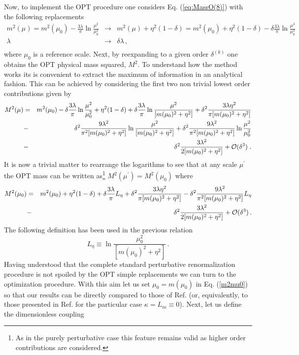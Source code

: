 \documentclass[a4paper,11pt]{article}
\def\nn{\nonumber}
\def\be{\begin{equation}}
\def\ee{\end{equation}}
\def\bea{\begin{eqnarray}}
\def\eea{\end{eqnarray}}
\def\lm{L_m}
\def\leta{L_\eta}
\begin{document}
Now, to implement the OPT procedure one considers Eq. (\ref {eq:MassO(8)}) with the following  replacements \cite{opt_phi4}
\bea\label{eq:OPT}
m^2(\mu)= m^2(\mu_0) -   \frac{3\lambda}{\pi}\ln{\frac{\mu^2}{\mu_0^2}} &\longrightarrow& m^2(\mu) + \eta^2(1-\delta) = m^2(\mu_0) + \eta^2(1-\delta)- \delta  \frac{3\lambda}{\pi}\ln{\frac{\mu^2}{\mu_0^2}} \nn \\ \nn
\lambda &\longrightarrow& \delta\lambda \,,\\
\label{replaceOPT}
\eea
where $\mu_0$ is a reference scale. Next,  by reexpanding to a given order $\delta^{(k)}$ one obtains the OPT physical mass squared, $M^2$. To understand how the method works its is convenient to extract the maximum of information in an analytical fashion. This can be achieved by considering the first two non trivial lowest order  contributions given by
\bea\label{eq:MassO(2)}
M^2(\mu)& = & m^2(\mu_0)  - \delta  \frac{3\lambda}{\pi}\ln{\frac{\mu^2}{\mu_0^2}} + \eta^2 (1- \delta) + \delta \frac{3\lambda}{\pi} \ln{\frac{\mu^2}{[m(\mu_0)^2+\eta^2]}}+ \delta^2  \frac{3\lambda \eta^2}{\pi[m(\mu_0)^2+\eta^2]}  \nn \\
&-& \delta^2 \frac{9\lambda^2}{\pi^2[m(\mu_0)^2+\eta^2]}\ln{\frac{\mu^2}{[m(\mu_0)^2+\eta^2]}}+\delta^2 \frac{9\lambda^2}{\pi^2[m(\mu_0)^2+\eta^2]}\ln \frac{\mu^2}{\mu_0^2}
\nn \\
&-& \delta^2 \frac{3\lambda^2}{2[m(\mu_0)^2+\eta^2]} + {\cal O}(\delta^3) \;. 
\label{M2mus}
\eea
 It is now a trivial matter to rearrange the logarithms to see that at any scale $\mu^\prime$ the  OPT mass can be written as\footnote {As in the purely perturbative case this feature remains valid as higher order contributions are considered.} $M^2(\mu^\prime) = M^2(\mu_0)$ where
\bea\label{eq:MassO(2)RG}
M^2(\mu_0) &=& m^2(\mu_0)   + \eta^2 (1- \delta) + \delta \frac{3\lambda}{\pi}\leta + \delta^2  \frac{3\lambda \eta^2}{\pi[m(\mu_0)^2+\eta^2]} - \delta^2 \frac{9\lambda^2}{\pi^2[m(\mu_0)^2+\eta^2]}\leta \nn \\
&-&  \delta^2 \frac{3\lambda^2}{2[m(\mu_0)^2+\eta^2]} + {\cal O}(\delta^3) \,.
\label{m2mu0}
\eea
The following definition has been used in the previous relation 
\be\label{eq:Leta}
 L_\eta \equiv \ln{\frac{\mu_0^2}{[m(\mu_0)^2+\eta^2]}} \,.
\ee
Having understood that the complete standard perturbative renormalization procedure is not spoiled by the OPT simple replacements we can turn to the optimization procedure. With this aim let us set $ \mu_0 = m(\mu_0)$ in Eq. (\ref {m2mu0}) so that our results can be directly compared to those of Ref. \cite {serone1} (or, equivalently, to those presented in Ref. \cite {serone3}  for the particular  case $\kappa = \lm \equiv 0$). Next, let us define the dimensionless coupling
\end{document}
